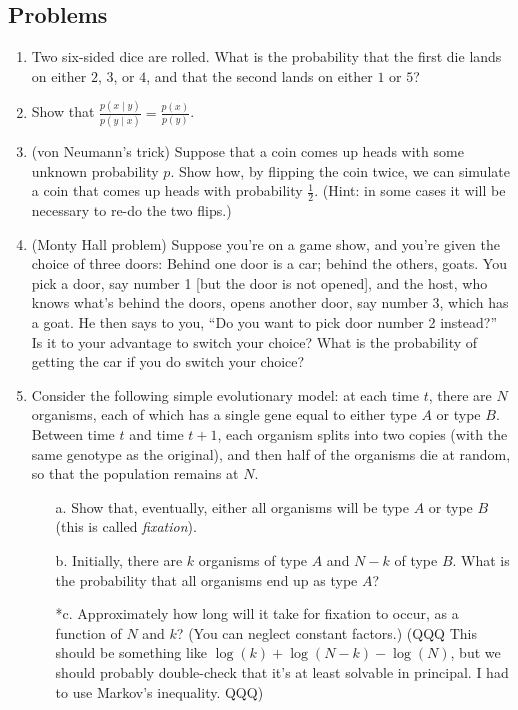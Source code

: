 \documentclass[11pt]{article}
\begin{document}
\subsection{Problems}
\begin{enumerate}
\item Two six-sided dice are rolled. What is the probability that the first die lands on either $2$, $3$, or $4$, and that the second lands on either $1$ or $5$?
\item Show that $\frac{p(x \mid y)}{p(y \mid x)} = \frac{p(x)}{p(y)}$.
\item (von Neumann's trick) Suppose that a coin comes up heads with some unknown probability $p$. Show how, by flipping the coin twice, we can simulate a coin that comes up heads with probability $\frac{1}{2}$. (Hint: in some cases it will be necessary to re-do the two flips.)
\item (Monty Hall problem) Suppose you're on a game show, and you're given the choice of three doors: Behind one door is a car; behind the others, goats. You pick a door, say number 1 [but the door is not opened], and the host, who knows what's behind the doors, opens another door, say number 3, which has a goat. He then says to you, ``Do you want to pick door number 2 instead?'' Is it to your advantage to switch your choice? What is the probability of getting the car if you do switch your choice?
\item Consider the following simple evolutionary model: at each time $t$, there are $N$ organisms, each of which has a single gene equal to either type $A$ or type $B$. Between time $t$ and time $t+1$, each organism splits into two copies (with the same genotype as the original), and then half of the organisms die at random, so that the population remains at $N$.
\begin{itemize}
\item[a.] Show that, eventually, either all organisms will be type $A$ or type $B$ (this is called \emph{fixation}).
\item[b.] Initially, there are $k$ organisms of type $A$ and $N-k$ of type $B$. What is the probability that all organisms end up as type $A$?
\item[*c.] Approximately how long will it take for fixation to occur, as a function of $N$ and $k$? (You can neglect constant factors.) (QQQ This should be something like $\log(k)+\log(N-k)-\log(N)$, but we should probably double-check that it's at least solvable in principal. I had to use Markov's inequality. QQQ)
\end{itemize}

\end{enumerate}
\end{document}
